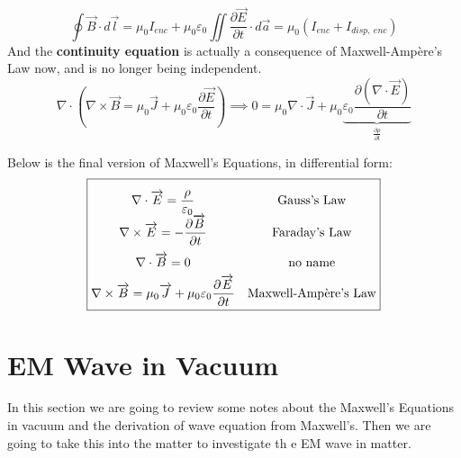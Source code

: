 \documentclass[12pt,a4paper,twoside]{article}
\numberwithin{equation}{section}
\begin{document}
\[\oint\overrightarrow{B}\cdot d\overrightarrow{l}=\mu_0I_{enc}+\mu_0\varepsilon_0\iint\frac{\partial \overrightarrow{E}}{\partial t}\cdot d\overrightarrow{a}=\mu_0(I_{enc}+I_{disp,\ enc})\]
And the \textbf{continuity equation} is actually a consequence of Maxwell-Amp\`ere's Law now, and is no longer being independent.
\[\nabla\cdot \left(\nabla\times \overrightarrow{B}=\mu_0\overrightarrow{J}+\mu_0\varepsilon_0\frac{\partial \overrightarrow{E}}{\partial t}\right)\implies 0=\mu_0\nabla\cdot \overrightarrow{J}+\mu_0\underbrace{\varepsilon_0\frac{\partial (\nabla \cdot \overrightarrow{E})}{\partial t}}_{\frac{\partial \rho}{\partial t}}\]

\noindent Below is the final version of Maxwell's Equations, in differential form:
\begin{equation}
    \def\arraystretch{2}
    \boxed{\begin{matrix}
        \nabla\cdot \overrightarrow{E} = \dfrac{\rho}{\varepsilon_0} & \text{Gauss's Law}\\ 
        \nabla \times \overrightarrow{E} = -\dfrac{\partial \overrightarrow{B}}{\partial t} & \text{Faraday's Law}\\ 
        \nabla \cdot \overrightarrow{B} = 0 & \text{no name}\\
        \nabla \times \overrightarrow{B} = \mu_0\overrightarrow{J}+\mu_0\varepsilon_0\dfrac{\partial \overrightarrow{E}}{\partial t} & \text{Maxwell-Amp\`ere's Law}
    \end{matrix}}
    \label{eq: Maxwell-equations}
\end{equation}
\newpage


\section{EM Wave in Vacuum}
In this section we are going to review some notes about the Maxwell's Equations in vacuum and the derivation of wave equation from Maxwell's. Then we are going to take this into the matter to investigate th e EM wave in matter.
\end{document}
